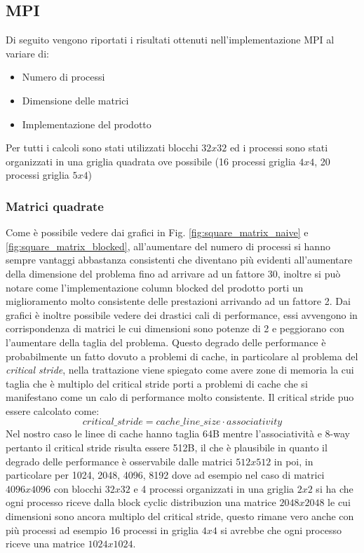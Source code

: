 \documentclass[conference]{IEEEtran}
\begin{document}
\subsection{MPI}
Di seguito vengono riportati i risultati ottenuti nell'implementazione MPI al variare di:
\begin{itemize}
    \item Numero di processi
    \item Dimensione delle matrici
    \item Implementazione del prodotto
\end{itemize}
Per tutti i calcoli sono stati utilizzati blocchi $32x32$ ed i processi sono stati organizzati in una griglia quadrata ove possibile (16 processi griglia $4x4$, 20 processi griglia $5x4$)

\subsubsection{Matrici quadrate}
Come è possibile vedere dai grafici in Fig. \ref{fig:square_matrix_naive} e \ref{fig:square_matrix_blocked}, all'aumentare del numero di processi si hanno sempre vantaggi abbastanza consistenti che diventano più evidenti all'aumentare della dimensione del problema fino ad arrivare ad un fattore 30, inoltre si può notare come l'implementazione column blocked del prodotto porti un miglioramento molto consistente delle prestazioni arrivando ad un fattore 2. Dai grafici è inoltre possibile vedere dei drastici cali di performance, essi avvengono in corrispondenza di matrici le cui dimensioni sono potenze di 2 e peggiorano con l'aumentare della taglia del problema. Questo degrado delle performance è probabilmente un fatto dovuto a problemi di cache, in particolare al problema del \textit{critical stride}\cite{b1}, nella trattazione viene spiegato come avere zone di memoria la cui taglia che è multiplo del critical stride porti a problemi di cache che si manifestano come un calo di performance molto consistente. Il critical stride puo essere calcolato come:
\begin{equation}
    critical\_stride = cache\_line\_size \cdot associativity
\end{equation}
Nel nostro caso le linee di cache hanno taglia 64B mentre l'associatività e 8-way pertanto il critical stride risulta essere 512B, il che è plausibile in quanto il degrado delle performance è osservabile dalle matrici $512x512$ in poi, in particolare per 1024, 2048, 4096, 8192 dove ad esempio nel caso di matrici $4096x4096$ con blocchi $32x32$ e 4 processi organizzati in una griglia $2x2$ si ha che ogni processo riceve dalla block cyclic distribuzion una matrice $2048x2048$ le cui dimensioni sono ancora multiplo del critical stride, questo rimane vero anche con più processi ad esempio 16 processi in griglia $4x4$ si avrebbe che ogni processo riceve una matrice $1024x1024$.
\end{document}
